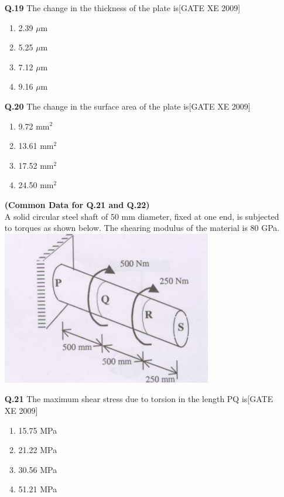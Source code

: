 \documentclass[journal,12pt,onecolumn]{IEEEtran}
\theoremstyle{remark}
\begin{document}
\begin{enumerate}
    \item [\textbf{Q.19}] The change in the thickness of the plate is\hfill[GATE XE 2009]
\begin{multicols}{2}
\begin{enumerate}
    \item 2.39 $\mu$m
    \item 5.25 $\mu$m
    \item 7.12 $\mu$m
    \item 9.16 $\mu$m

\end{enumerate}
\end{multicols}

\item[\textbf{Q.20}] The change in the surface area of the plate is\hfill[GATE XE 2009]
\begin{multicols}{2}
\begin{enumerate}
    \item 9.72 mm$^2$
    \item 13.61 mm$^2$
    \item 17.52 mm$^2$
    \item 24.50 mm$^2$
\end{enumerate}
\end{multicols}

\vspace{0.3cm}


  
\textbf{(Common Data for Q.21 and Q.22)}  \\
A solid circular steel shaft of 50 mm diameter, fixed at one end, is subjected to torques as shown below. The shearing modulus of the material is 80 GPa. \\


    
    \includegraphics[width=0.5\columnwidth]{figs/fig25.png}
  


\item[\textbf{Q.21}] The maximum shear stress due to torsion in the length PQ is\hfill[GATE XE 2009]
\begin{multicols}{2}
\begin{enumerate}
    \item 15.75 MPa
    \item 21.22 MPa
    \item 30.56 MPa
    \item 51.21 MPa
\end{enumerate}
\end{multicols}


\end{enumerate}
\end{document}
